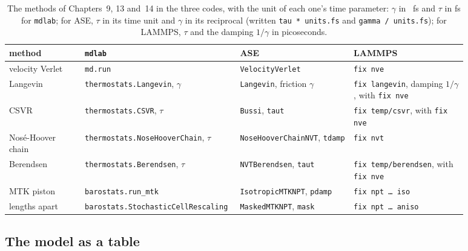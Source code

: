 \begin{table}[htb]
\centering
\small
\caption{The methods of Chapters~9, 13 and~14 in the three codes, with the
unit of each one's time parameter: $\gamma$ in \si{\per\femto\second} and
$\tau$ in \si{\femto\second} for \texttt{mdlab}; for ASE, $\tau$ in its
time unit and $\gamma$ in its reciprocal (written \texttt{tau * units.fs}
and \texttt{gamma / units.fs}); for LAMMPS, $\tau$ and the damping
$1/\gamma$ in picoseconds.}
\label{tab:ip-methods}
\begin{tabular}{@{}>{\raggedright\arraybackslash}p{0.16\linewidth}
   >{\raggedright\arraybackslash}p{0.24\linewidth}
   >{\raggedright\arraybackslash}p{0.24\linewidth}
   >{\raggedright\arraybackslash}p{0.24\linewidth}@{}}
\toprule
method & \texttt{mdlab} & ASE & LAMMPS\\
\midrule
velocity Verlet & \texttt{md.run} & \texttt{VelocityVerlet} &
\texttt{fix nve}\\
Langevin & \texttt{thermostats.\allowbreak Langevin}, $\gamma$ & \texttt{Langevin},
friction $\gamma$ & \texttt{fix langevin}, damping $1/\gamma$, with
\texttt{fix nve}\\
CSVR & \texttt{thermostats.\allowbreak CSVR}, $\tau$ & \texttt{Bussi}, \texttt{taut} &
\texttt{fix temp/csvr}, with \texttt{fix nve}\\
Nosé-Hoover chain & \texttt{thermostats.\allowbreak NoseHoover\allowbreak Chain}, $\tau$ &
\texttt{NoseHoover\allowbreak ChainNVT}, \texttt{tdamp} & \texttt{fix nvt}\\
Berendsen & \texttt{thermostats.\allowbreak Berendsen}, $\tau$ & \texttt{NVTBerendsen},
\texttt{taut} & \texttt{fix temp/berendsen}, with \texttt{fix nve}\\
MTK piston & \texttt{barostats.\allowbreak run\_mtk} & \texttt{Isotropic\allowbreak MTKNPT},
\texttt{pdamp} & \texttt{fix npt \dots\ iso}\\
lengths apart & \texttt{barostats.\allowbreak Stochastic\allowbreak Cell\allowbreak Rescaling} &
\texttt{MaskedMTKNPT}, \texttt{mask} & \texttt{fix npt \dots\ aniso}\\
\bottomrule
\end{tabular}
\end{table}

\subsection*{The model as a table}

